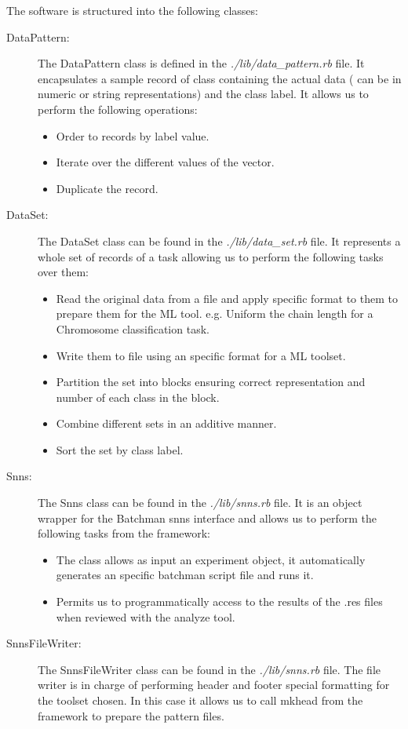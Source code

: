 \documentclass[a4paper,10pt,titlepage]{article}
\begin{document}
\par The software is structured into the following classes:
\begin{description}
	\item[DataPattern:] The DataPattern class is defined in the \textit{./lib/data\_pattern.rb} file. It encapsulates a sample record of class containing the actual data ( can be in numeric or string representations) and the class label. It allows us to perform the following operations: 
	\begin{itemize}
		\item Order to records by label value.
		\item Iterate over the different values of the vector.
		\item Duplicate the record.
	\end{itemize}
	\item[DataSet:] The DataSet class can be found in the \textit{./lib/data\_set.rb} file. It represents a whole set of records of a task allowing us to perform the following tasks over them:
	\begin{itemize}
		\item Read the original data from a file and apply specific format to them to prepare them for the ML tool. e.g. Uniform the chain length for a Chromosome classification task. 
		\item Write them to file using an specific format for a ML toolset.
		\item Partition the set into blocks ensuring correct representation and number of each class in the block.
		\item Combine different sets in an additive manner.
		\item Sort the set by class label.
	\end{itemize}
	\item[Snns:] The Snns class can be found in the \textit{./lib/snns.rb} file. It is an object wrapper for the Batchman snns interface and allows us to perform the following tasks from the framework:
	\begin{itemize}
		\item The class allows as input an experiment object, it automatically generates an specific batchman script file and runs it. 
		\item Permits us to programmatically access to the results of the .res files when reviewed with the analyze tool.
	\end{itemize}
	\item[SnnsFileWriter:] The SnnsFileWriter class can be found in the \textit{./lib/snns.rb} file. The file writer is in charge of performing header and footer special formatting for the toolset chosen. In this case it allows us to call mkhead from the framework to prepare the pattern files. 

\end{description}
\end{document}
